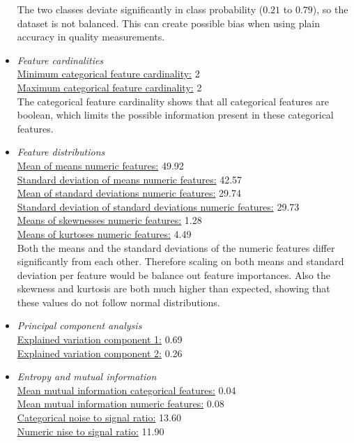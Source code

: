 \documentclass[10pt,a4paper]{article}
\begin{document}
\begin{itemize}
		The two classes deviate significantly in class probability ($0.21$ to $0.79$), so the dataset is not balanced. This can create possible bias when using plain accuracy in quality measurements.
		
		\item \textit{Feature cardinalities} \\
		\underline{Minimum categorical feature cardinality:} 2 \\
		\underline{Maximum categorical feature cardinality:} 2 \\
		
		The categorical feature cardinality shows that all categorical features are boolean, which limits the possible information present in these categorical features.
		
		\item \textit{Feature distributions} \\
		\underline{Mean of means numeric features:} 49.92 \\
		\underline{Standard deviation of means numeric features:} 42.57 \\
		\underline{Mean of standard deviations numeric features:} 29.74 \\
		\underline{Standard deviation of standard deviations numeric features:} 29.73 \\
		\underline{Means of skewnesses numeric features:} 1.28 \\
		\underline{Means of kurtoses numeric features:} 4.49 \\
		
		Both the means and the standard deviations of the numeric features differ significantly from each other. Therefore scaling on both means and standard deviation per feature would be balance out feature importances. Also the skewness and kurtosis are both much higher than expected, showing that these values do not follow normal distributions.
		
		\item \textit{Principal component analysis} \\
		\underline{Explained variation component 1:} 0.69 \\
		\underline{Explained variation component 2:} 0.26 \\
		\item \textit{Entropy and mutual information} \\
		\underline{Mean mutual information categorical features:} 0.04 \\
		\underline{Mean mutual information numeric features:} 0.08 \\
		\underline{Categorical noise to signal ratio:} 13.60 \\
		\underline{Numeric nise to signal ratio:} 11.90 \\
		

\end{itemize}
\end{document}

